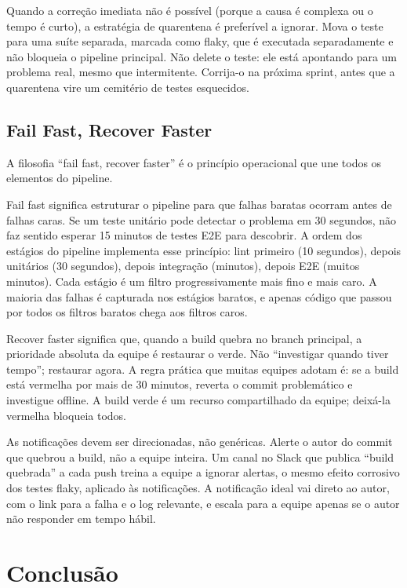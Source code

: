 Quando a correção imediata não é possível (porque a causa é complexa ou o tempo
é curto), a estratégia de quarentena é preferível a ignorar. Mova o teste para
uma suíte separada, marcada como flaky, que é executada separadamente e não
bloqueia o pipeline principal. Não delete o teste: ele está apontando para um
problema real, mesmo que intermitente. Corrija-o na próxima sprint, antes que a
quarentena vire um cemitério de testes esquecidos.

\subsection{Fail Fast, Recover Faster}

A filosofia ``fail fast, recover faster'' é o princípio operacional que une
todos os elementos do pipeline.

Fail fast significa estruturar o pipeline para que falhas baratas ocorram antes
de falhas caras. Se um teste unitário pode detectar o problema em 30 segundos,
não faz sentido esperar 15 minutos de testes E2E para descobrir. A ordem dos
estágios do pipeline implementa esse princípio: lint primeiro (10 segundos),
depois unitários (30 segundos), depois integração (minutos), depois E2E
(muitos minutos). Cada estágio é um filtro progressivamente mais fino e mais
caro. A maioria das falhas é capturada nos estágios baratos, e apenas código
que passou por todos os filtros baratos chega aos filtros caros.

Recover faster significa que, quando a build quebra no branch principal, a
prioridade absoluta da equipe é restaurar o verde. Não ``investigar quando
tiver tempo''; restaurar agora. A regra prática que muitas equipes adotam
é: se a build está vermelha por mais de 30 minutos, reverta o commit
problemático e investigue offline. A build verde é um recurso compartilhado da
equipe; deixá-la vermelha bloqueia todos.

As notificações devem ser direcionadas, não genéricas. Alerte o autor do commit
que quebrou a build, não a equipe inteira. Um canal no Slack que publica ``build
quebrada'' a cada push treina a equipe a ignorar alertas, o mesmo efeito
corrosivo dos testes flaky, aplicado às notificações. A notificação ideal vai
direto ao autor, com o link para a falha e o log relevante, e escala para a
equipe apenas se o autor não responder em tempo hábil.

\section{Conclusão}

